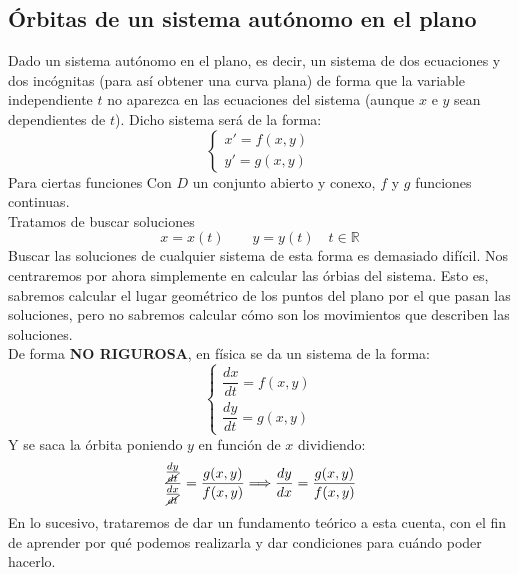 \subsection{Órbitas de un sistema autónomo en el plano}
Dado un sistema autónomo en el plano, es decir, un sistema de dos ecuaciones y dos incógnitas (para así obtener una curva plana) de forma que la variable independiente $t$ no aparezca en las ecuaciones del sistema (aunque $x$ e $y$ sean dependientes de $t$). Dicho sistema será de la forma:
\begin{equation*}
    \left\{\begin{array}{c}
            x' = f(x,y) \\
            y' = g(x,y)
    \end{array}\right.
\end{equation*}
Para ciertas funciones
Con $D$ un conjunto abierto y conexo, $f$ y $g$ funciones continuas.\\

Tratamos de buscar soluciones
\begin{equation*}
    x=x(t) \qquad y=y(t) \quad t\in \mathbb{R}
\end{equation*}
Buscar las soluciones de cualquier sistema de esta forma es demasiado difícil. Nos centraremos por ahora simplemente en calcular las órbias del sistema. Esto es, sabremos calcular el lugar geométrico de los puntos del plano por el que pasan las soluciones, pero no sabremos calcular cómo son los movimientos que describen las soluciones.\\

\noindent
De forma \textbf{NO RIGUROSA}, en física se da un sistema de la forma:
\begin{equation*}
    \left\{\begin{array}{c}
        \dfrac{dx}{dt} = f(x,y) \\
        \dfrac{dy}{dt} = g(x,y)
    \end{array}\right.
\end{equation*}
Y se saca la órbita poniendo $y$ en función de $x$ dividiendo:
\begin{equation*}
    \dfrac{\frac{dy}{\cancel{dt}}}{\frac{dx}{\cancel{dt}}} = \dfrac{g(x,y)}{f(x,y)} \Longrightarrow \dfrac{dy}{dx} = \dfrac{g(x,y)}{f(x,y)}
\end{equation*}
En lo sucesivo, trataremos de dar un fundamento teórico a esta cuenta, con el fin de aprender por qué podemos realizarla y dar condiciones para cuándo poder hacerlo.


